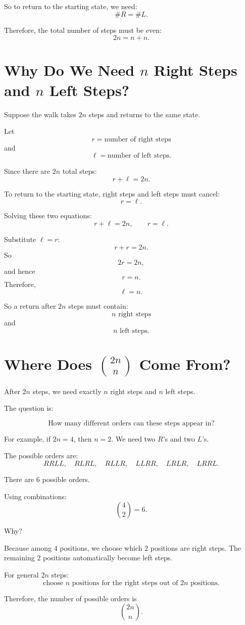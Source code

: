 \documentclass[12pt,a4paper]{article}
\theoremstyle{notestyle}
\begin{document}
So to return to the starting state, we need:
\[
\#R=\#L.
\]

Therefore, the total number of steps must be even:
\[
2n=n+n.
\]

\section{Why Do We Need $n$ Right Steps and $n$ Left Steps?}

Suppose the walk takes $2n$ steps and returns to the same state.

Let
\[
r=\text{number of right steps}
\]
and
\[
\ell=\text{number of left steps}.
\]

Since there are $2n$ total steps:
\[
r+\ell=2n.
\]

To return to the starting state, right steps and left steps must cancel:
\[
r=\ell.
\]

Solving these two equations:
\[
r+\ell=2n,
\qquad
r=\ell.
\]

Substitute $\ell=r$:
\[
r+r=2n.
\]
So
\[
2r=2n,
\]
and hence
\[
r=n.
\]
Therefore,
\[
\ell=n.
\]

So a return after $2n$ steps must contain:
\[
n\text{ right steps}
\]
and
\[
n\text{ left steps}.
\]

\section{Where Does $\binom{2n}{n}$ Come From?}

After $2n$ steps, we need exactly $n$ right steps and $n$ left steps.

The question is:

\[
\text{How many different orders can these steps appear in?}
\]

For example, if $2n=4$, then $n=2$. We need two $R$'s and two $L$'s.

The possible orders are:
\[
RRLL,\quad RLRL,\quad RLLR,\quad LLRR,\quad LRLR,\quad LRRL.
\]

There are 6 possible orders.

Using combinations:
\[
\binom{4}{2}=6.
\]

Why?

Because among 4 positions, we choose which 2 positions are right steps. The remaining 2 positions automatically become left steps.

For general $2n$ steps:
\[
\text{choose }n\text{ positions for the right steps out of }2n\text{ positions}.
\]

Therefore, the number of possible orders is
\[
\binom{2n}{n}.
\]
\end{document}
